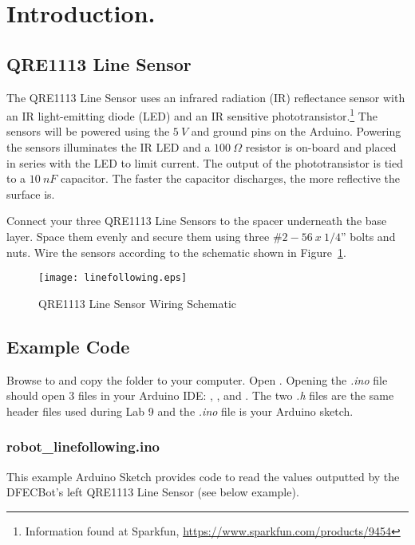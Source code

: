 \documentclass{handout}
\begin{document}
	\newpage
	\clearpage
	\pagebreak
	
	\section{Introduction.}
	
	\subsection{QRE1113 Line Sensor}
	The QRE1113 Line Sensor uses an infrared radiation (IR) reflectance sensor with an IR light-emitting diode (LED) and an IR sensitive phototransistor.\footnote{Information found at Sparkfun, \url{https://www.sparkfun.com/products/9454}} The sensors will be powered using the $5\ V$ and ground pins on the Arduino. Powering the sensors illuminates the IR LED and a $100\ \Omega$ resistor is on-board and placed in series with the LED to limit current. The output of the phototransistor is tied to a $10\ nF$ capacitor. The faster the capacitor discharges, the more reflective the surface is.\footnotemark[1]
	
	Connect your three QRE1113 Line Sensors to the spacer underneath the base layer. Space them evenly and secure them using three $\#2-56\ x\ 1/4”$ bolts and nuts. Wire the sensors according to the schematic shown in Figure~\ref{Fig Line}.
	
	\begin{figure} [H]
		\centering
		\texttt{[image: linefollowing.eps]}
		\caption{QRE1113 Line Sensor Wiring Schematic}
		\label{Fig Line}
	\end{figure}
	
	\subsection{Example Code}
	Browse to  and copy the  folder to your computer. Open . Opening the \textit{.ino} file should open 3 files in your Arduino IDE: , , and . The two \textit{.h} files are the same header files used during Lab 9 and the \textit{.ino} file is your Arduino sketch.
	
	\subsubsection{robot\_linefollowing.ino}
	This example Arduino Sketch provides code to read the values outputted by the DFECBot's left QRE1113 Line Sensor (see below example).
	
\end{document}
